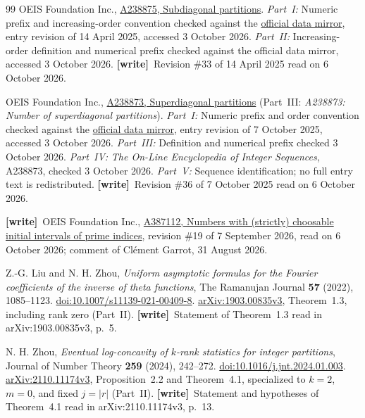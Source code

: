 \documentclass[11pt,letterpaper]{article}
\numberwithin{equation}{section}
\theoremstyle{remark}\newtheorem{remark}[theorem]{Remark}
\newcommand{\wtag}{\textup{\textbf{[write]}}}
\begin{document}
\begin{thebibliography}{99}
OEIS Foundation Inc.,
\href{https://oeis.org/A238875}{A238875, Subdiagonal partitions}.
\emph{Part~I:} Numeric prefix and increasing-order convention checked against the
\href{https://github.com/oeis/oeisdata/blob/main/seq/A238/A238875.seq}{official data mirror},
entry revision of 14 April 2025, accessed 3 October 2026.
\emph{Part~II:} Increasing-order definition and numerical prefix checked against the
official data mirror, accessed 3 October 2026.
\wtag\ Revision \#33 of 14 April 2025 read on 6 October 2026.

OEIS Foundation Inc.,
\href{https://oeis.org/A238873}{A238873, Superdiagonal partitions}
(Part~III: \emph{A238873: Number of superdiagonal partitions}).
\emph{Part~I:} Numeric prefix and order convention checked against the
\href{https://github.com/oeis/oeisdata/blob/main/seq/A238/A238873.seq}{official data mirror},
entry revision of 7 October 2025, accessed 3 October 2026.
\emph{Part~III:} Definition and numerical prefix checked 3 October 2026.
\emph{Part~IV:} \emph{The On-Line Encyclopedia of Integer Sequences}, A238873, checked 3 October 2026.
\emph{Part~V:} Sequence identification; no full entry text is redistributed.
\wtag\ Revision \#36 of 7 October 2025 read on 6 October 2026.

\wtag\ OEIS Foundation Inc.,
\href{https://oeis.org/A387112}{A387112, Numbers with (strictly) choosable initial intervals of prime indices},
revision \#19 of 7 September 2026, read on 6 October 2026; comment of Clément Garrot, 31 August 2026.

Z.-G. Liu and N. H. Zhou,
\emph{Uniform asymptotic formulas for the Fourier coefficients of
the inverse of theta functions},
The Ramanujan Journal \textbf{57} (2022), 1085--1123.
\href{https://doi.org/10.1007/s11139-021-00409-8}{doi:10.1007/s11139-021-00409-8}.
\href{https://arxiv.org/abs/1903.00835v3}{arXiv:1903.00835v3},
Theorem~1.3, including rank zero (Part~II).
\wtag\ Statement of Theorem~1.3 read in arXiv:1903.00835v3, p.~5.

N. H. Zhou, \emph{Eventual log-concavity of $k$-rank statistics
for integer partitions}, Journal of Number Theory
\textbf{259} (2024), 242--272.
\href{https://doi.org/10.1016/j.jnt.2024.01.003}{doi:10.1016/j.jnt.2024.01.003}.
\href{https://arxiv.org/abs/2110.11174v3}{arXiv:2110.11174v3},
Proposition~2.2 and Theorem~4.1, specialized to $k=2$, $m=0$,
and fixed $j=|r|$ (Part~II).
\wtag\ Statement and hypotheses of Theorem~4.1 read in arXiv:2110.11174v3, p.~13.


\end{thebibliography}
\end{document}
